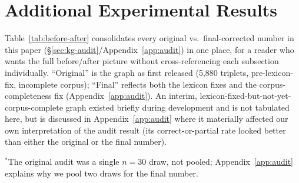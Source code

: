 \documentclass{article}
\begin{document}
\newpage
\section{Additional Experimental Results}
\label{app:additional}
Table~\ref{tab:before-after} consolidates every original vs.\ final-corrected number in this paper (\S\ref{sec:kg-audit}/Appendix~\ref{app:audit}) in one place, for a reader who wants the full before/after picture without cross-referencing each subsection individually. ``Original'' is the graph as first released (5{,}880 triplets, pre-lexicon-fix, incomplete corpus); ``Final'' reflects both the lexicon fixes and the corpus-completeness fix (Appendix~\ref{app:audit}). An interim, lexicon-fixed-but-not-yet-corpus-complete graph existed briefly during development and is not tabulated here, but is discussed in Appendix~\ref{app:audit} where it materially affected our own interpretation of the audit result (its correct-or-partial rate looked better than either the original or the final number).

\begin{table}[h]
\centering
\caption{Every measured original vs.\ final number in this paper, in one place (\S\ref{sec:kg-audit}, \S\ref{sec:kgbaseline-measured}, \S\ref{sec:bench-protocol}). ``---'' marks a quantity not remeasured (Claude (direct), Appendix~\ref{sec:limitations}) or unaffected by construction (BM25/No-RAG, which do not consult \textsc{AlzKG}'s entity/edge content the way Graph-RAG and the KG-only baseline do).}
\label{tab:before-after}
\small
{}
\end{table}
\footnotesize $^{*}$The original audit was a single $n{=}30$ draw, not pooled; Appendix~\ref{app:audit} explains why we pool two draws for the final number.
\end{document}
